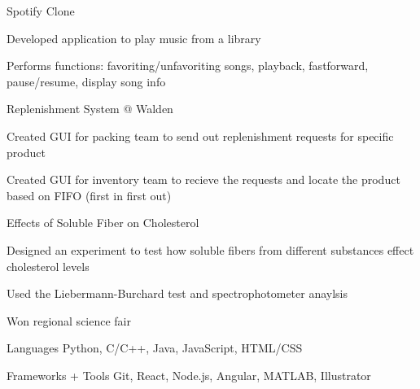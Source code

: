 \documentclass[12pt, letterpaper]{awesome-cv}
\begin{document}
\begin{cventries}
  \cventry
    {} %
    {Spotify Clone} %
    {} %
    {} %
    {
      \vspace{-0.2in}
      \begin{cvitems} %
        \vspace{-0.5in}
        \item {Developed application to play music from a library}
        \item {Performs functions: favoriting/unfavoriting songs, playback, fastforward, pause/resume, display song info}
      \end{cvitems}
    }

  \cventry
    {} %
    {Replenishment System @ Walden} %
    {} %
    {} %
    {
      \vspace{-0.2in}
      \begin{cvitems} %
        \vspace{-0.1in}
        \item {Created GUI for packing team to send out replenishment requests for specific product}
        \item {Created GUI for inventory team to recieve the requests and locate the product based on FIFO (first in first out)}
      \end{cvitems}
    }

    \cventry
    {} %
    {Effects of Soluble Fiber on Cholesterol} %
    {} %
    {} %
    {
      \vspace{-0.2in}
      \begin{cvitems} %
        \item {Designed an experiment to test how soluble fibers from different substances effect cholesterol levels}
        \item {Used the Liebermann-Burchard test and spectrophotometer anaylsis}
        \item {Won regional science fair}
      \end{cvitems}
    }
\end{cventries}

\begin{cvskills}
  \cvskill
    {Languages} %
    {Python, C/C++, Java, JavaScript, HTML/CSS} %

  \cvskill
    {Frameworks + Tools} %
    {Git, React, Node.js, Angular, MATLAB, Illustrator} %
  
    
\end{cvskills}

\end{document}
